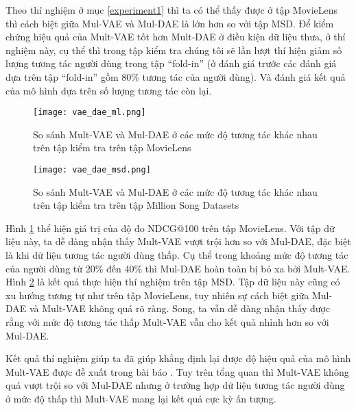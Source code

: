     Theo thí nghiệm ở mục \ref{experiment1} thì ta có thể thấy được ở tập MovieLens thì cách biệt giữa Mul-VAE và Mul-DAE là lớn hơn so với tập MSD.
    Để kiểm chứng hiệu quả của Mult-VAE tốt hơn Mult-DAE ở điều kiện dữ liệu thưa, ở thí nghiệm này, cụ thể thì trong tập kiểm tra chúng tôi sẽ lần lượt thí hiện giảm số lượng tương tác người dùng trong tập ``fold-in'' (ở đánh giá trước các đánh giá dựa trên tập ``fold-in'' gồm 80\% tương tác của người dùng). Và đánh giá kết quả của mô hình dựa trên số lượng tương tác còn lại.
    
    \begin{figure}
        \centering
        \texttt{[image: vae\_dae\_ml.png]}
        \caption{So sánh Mult-VAE và Mul-DAE ở các mức độ tương tác khác nhau trên tập kiểm tra trên tập MovieLens}
        \label{fig_vae_dae_ml}
    \end{figure}
    \begin{figure}
        \centering
        \texttt{[image: vae\_dae\_msd.png]}
        \caption{So sánh Mult-VAE và Mul-DAE ở các mức độ tương tác khác nhau trên tập kiểm tra trên tập Million Song Datasets}
        \label{fig_vae_dae_msd}
    \end{figure}

    Hình \ref{fig_vae_dae_ml} thể hiện giá trị của độ đo NDCG@100 trên tập MovieLens. 
    Với tập dữ liệu này, ta dễ dàng nhận thấy Mult-VAE vượt trội hơn so với Mul-DAE, đặc biệt là khi dữ liệu tương tác người dùng thấp.
    Cụ thể trong khoảng mức độ tương tác của người dùng từ 20\% đến 40\% thì Mul-DAE hoàn toàn bị bỏ xa bởi Mult-VAE.
    Hình \ref{fig_vae_dae_msd} là kết quả thực hiện thí nghiệm trên tập MSD.
    Tập dữ liệu này cũng có xu hướng tương tự như trên tập MovieLens, tuy nhiên sự cách biệt giữa Mul-DAE và Mult-VAE không quá rõ ràng.
    Song, ta vẫn dễ dàng nhận thấy được rằng với mức độ tương tác thấp Mult-VAE vẫn cho kết quả nhỉnh hơn so với Mul-DAE.

    Kết quả thí nghiệm giúp ta đã giúp khẳng định lại được độ hiệu quả của mô hình Mult-VAE được đề xuất trong bài báo \cite{mvae}. 
    Tuy trên tổng quan thì Mult-VAE không quá vượt trội so với Mul-DAE nhưng ở trường hợp dữ liệu tương tác người dùng ở mức độ thấp thì Mult-VAE mang lại kết quả cực kỳ ấn tượng.



